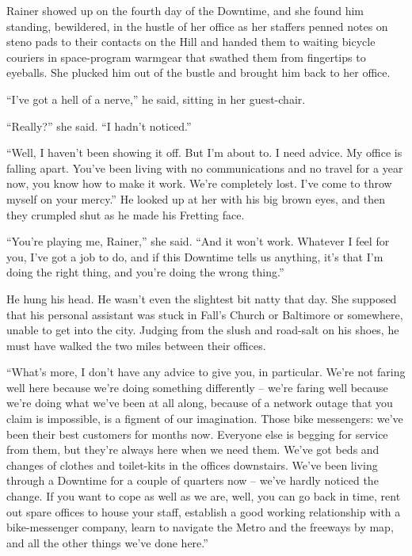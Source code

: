 Rainer showed up on the fourth day of the Downtime, and she found him 
standing, bewildered, in the hustle of her office as her staffers 
penned notes on steno pads to their contacts on the Hill and handed 
them to waiting bicycle couriers in space-program warmgear that swathed 
them from fingertips to eyeballs. She plucked him out of the bustle and 
brought him back to her office.

“I've got a hell of a nerve,” he said, sitting in her guest-chair.

“Really?” she said. “I hadn't noticed.”

“Well, I haven't been showing it off. But I'm about to. I need 
advice. My office is falling apart. You've been living with no 
communications and no travel for a year now, you know how to make it 
work. We're completely lost. I've come to throw myself on your 
mercy.” He looked up at her with his big brown eyes, and then they 
crumpled shut as he made his Fretting face.

“You're playing me, Rainer,” she said. “And it won't work. 
Whatever I feel for you, I've got a job to do, and if this Downtime 
tells us anything, it's that I'm doing the right thing, and you're 
doing the wrong thing.”

He hung his head. He wasn't even the slightest bit natty that day. She 
supposed that his personal assistant was stuck in Fall's Church or 
Baltimore or somewhere, unable to get into the city. Judging from the 
slush and road-salt on his shoes, he must have walked the two miles 
between their offices.

“What's more, I don't have any advice to give you, in particular. 
We're not faring well here because we're doing something differently -- 
we're faring well because we're doing what we've been at all along, 
because of a network outage that you claim is impossible, is a figment 
of our imagination. Those bike messengers: we've been their best 
customers for months now. Everyone else is begging for service from 
them, but they're always here when we need them. We've got beds and 
changes of clothes and toilet-kits in the offices downstairs. We've 
been living through a Downtime for a couple of quarters now -- we've 
hardly noticed the change. If you want to cope as well as we are, well, 
you can go back in time, rent out spare offices to house your staff, 
establish a good working relationship with a bike-messenger company, 
learn to navigate the Metro and the freeways by map, and all the other 
things we've done here.”

